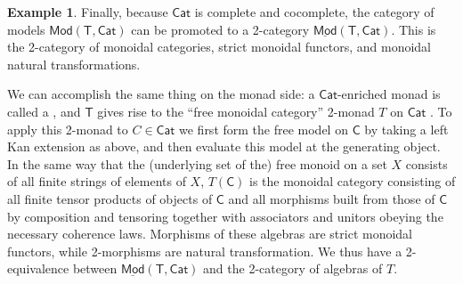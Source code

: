 \documentclass{amsart}
\newcommand{\define}[1]{{\bf \boldmath{#1}}}
\theoremstyle{definition}
\newtheorem{example}[theorem]{Example}
\newcommand{\Cat}{\mathsf{Cat}}
\newcommand{\Mod}{\mathsf{Mod}}
\newcommand{\NN}{\mathsf{N}}
\newcommand{\V}{\mathsf{V}}
\newcommand{\C}{\mathsf{C}}
\newcommand{\T}{\mathsf{T}}
\newcommand{\maps}{\colon}
\begin{document}
\begin{example}
Finally, because $\Cat$ is complete and cocomplete, the category of models $\Mod(\T,\Cat)$ can be promoted to a 2-category $\underline{\Mod}(\T,\Cat)$.  This is the 2-category of monoidal categories, strict monoidal functors, and monoidal natural transformations.

We can accomplish the same thing on the monad side: a $\Cat$-enriched monad is called a \define{2-monad}, and $\T$ gives rise to the ``free monoidal category'' 2-monad $T$ on $\Cat$ \cite{bkp}. To apply this 2-monad to $C \in \Cat$ we first form the free model on $\C$ by taking a left Kan extension as above, and then evaluate this model at the generating object.  In the same way that the (underlying set of the) free monoid on a set $X$ consists of all finite strings of elements of $X$, $T(\C)$ is the monoidal category consisting of all finite tensor products of objects of $\C$ and all morphisms built from those of $\C$ by composition and tensoring together with associators and unitors obeying the necessary coherence laws.   Morphisms of these algebras are strict monoidal functors, while 2-morphisms are natural transformation. We thus have a 2-equivalence between $\underline{\Mod}(\T,\Cat)$ and the 2-category of algebras of $T$.





\end{example}
\end{document}
